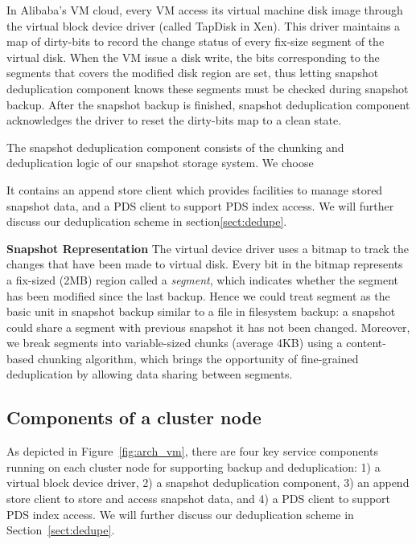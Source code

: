 {%
In Alibaba's VM cloud, every VM access its virtual machine disk image through the
virtual block device driver (called TapDisk\cite{Warfield2005} in Xen).
This driver maintains a map of dirty-bits to record
the change status of every fix-size segment of the virtual disk. 
When the VM issue a disk write, the bits corresponding to the segments that covers 
the modified disk region are set, thus letting snapshot deduplication component knows these
segments must be checked during snapshot backup. After the snapshot backup is finished, 
snapshot deduplication component acknowledges the driver to reset the dirty-bits map to
a clean state.

The snapshot deduplication component consists of the chunking and deduplication 
logic of our snapshot storage system. We choose 

It contains an append store client which provides facilities to manage stored snapshot data, and a PDS client to support PDS index access. We will further discuss our deduplication scheme in section\ref{sect:dedupe}.


{\bf Snapshot Representation}
The virtual device driver uses a bitmap to track the changes 
that have been made to virtual disk.
Every bit in the bitmap represents a fix-sized (2MB) region called a \textit{segment}, which indicates whether the segment
has been modified since the last backup. Hence we could treat segment as the basic unit 
in snapshot backup similar to a
file in filesystem backup: a snapshot could share a segment with previous snapshot it has not been changed. 
Moreover, we break segments into variable-sized chunks (average 4KB) using a content-based chunking algorithm,
which brings the opportunity of fine-grained deduplication by
allowing data sharing between segments.
}

\subsection{ Components of a cluster node } 

As  depicted in Figure~\ref{fig:arch_vm}, 
there are four key service components running on each cluster
node  for supporting backup and deduplication: 
1) a virtual block device driver, 2) a snapshot deduplication component,
3) an append store client to store  and access snapshot data,
and 4)  a PDS client to support PDS index access. We will further discuss our deduplication scheme 
in Section~\ref{sect:dedupe}.


